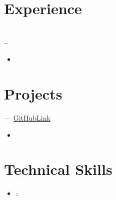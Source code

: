 \documentclass[10pt,a4paper]{article}
\providecommand{\VAR}[1]{}
\providecommand{\BLOCK}[1]{}
\begin{document}
\section*{Experience}
\BLOCK{for job in experience}
\noindent \textbf{\VAR{job.organization}} \hfill \VAR{job.location} \\
\textit{\VAR{job.title}} \hfill \VAR{job.start_date} -- \VAR{job.end_date or 'Present'}
\BLOCK{if job.bullets and job.bullets|length > 0}
\begin{itemize}[leftmargin=1.5em, itemsep=1pt, parsep=0pt, topsep=2pt]
    \BLOCK{for bullet in job.bullets}
    \item \VAR{bullet.text}
    \BLOCK{endfor}
\end{itemize}
\BLOCK{endif}
\vspace{2pt}
\BLOCK{endfor}

\BLOCK{elif section_name == 'projects' and projects and projects|length > 0}
\section*{Projects}
\BLOCK{for proj in projects}
\noindent \textbf{\VAR{proj.name}} --- \BLOCK{if proj.tech_stack is string}\textit{\VAR{proj.tech_stack}}\BLOCK{else}\textit{\VAR{proj.tech_stack|join(', ')}}\BLOCK{endif}
\BLOCK{if proj.link and "http" in proj.link}\hfill \href{\VAR{proj.link}}{\BLOCK{if "github" in proj.link|lower}GitHub\BLOCK{else}Link\BLOCK{endif}}\BLOCK{endif}

\BLOCK{if proj.bullets and proj.bullets|length > 0}
\begin{itemize}[leftmargin=1.5em, itemsep=1pt, parsep=0pt, topsep=2pt]
    \BLOCK{for bullet in proj.bullets}
    \item \VAR{bullet.text}
    \BLOCK{endfor}
\end{itemize}
\BLOCK{endif}
\vspace{2pt}
\BLOCK{endfor}

\BLOCK{elif section_name == 'technical_skills' and skills}
\section*{Technical Skills}
\begin{itemize}[leftmargin=1.5em, itemsep=2pt, parsep=0pt, topsep=2pt]
    \BLOCK{for skill_category, skill_list in skills.items()}
    \item \textbf{\VAR{skill_category | escape_latex}}: \BLOCK{if skill_list is string}\VAR{skill_list}\BLOCK{else}\VAR{skill_list|join(', ')}\BLOCK{endif}
    \BLOCK{endfor}
\end{itemize}

\BLOCK{endif}
\BLOCK{endfor}
\end{document}
